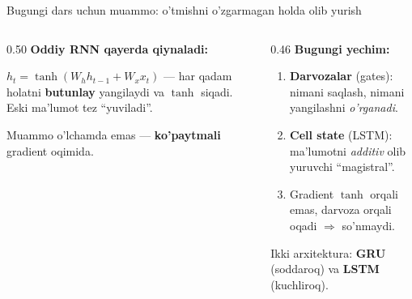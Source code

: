 \documentclass[aspectratio=169,11pt]{beamer}
\begin{document}
\begin{frame}{Bugungi dars uchun muammo: o'tmishni o'zgarmagan holda olib yurish}
  \begin{columns}[T]
    \begin{column}{0.50\textwidth}
      \textbf{Oddiy RNN qayerda qiynaladi:}\\[3pt]
      \small
      \begin{tcolorbox}[warnbox,title={Har qadam holatni qayta yozadi},top=2pt,bottom=2pt]
        \footnotesize
        $h_t=\tanh(W_h h_{t-1}+W_x x_t)$ --- har qadam holatni \textbf{butunlay}
        yangilaydi va $\tanh$ siqadi. Eski ma'lumot tez ``yuviladi''.
      \end{tcolorbox}
      \vspace{3pt}
      \begin{tcolorbox}[warnbox,title={Hidden o'lchamini oshirish yordam bermaydi},top=2pt,bottom=2pt]
        \footnotesize
        Muammo o'lchamda emas --- \textbf{ko'paytmali} gradient oqimida.
      \end{tcolorbox}
    \end{column}
    \begin{column}{0.46\textwidth}
      \textbf{Bugungi yechim:}\\[4pt]
      \small
      \begin{enumerate}\setlength\itemsep{4pt}
        \item \textbf{Darvozalar} (gates): nimani saqlash, nimani yangilashni
              \emph{o'rganadi}.
        \item \textbf{Cell state} (LSTM): ma'lumotni \emph{additiv} olib yuruvchi
              ``magistral''.
        \item Gradient $\tanh$ orqali emas, darvoza orqali oqadi $\Rightarrow$
              so'nmaydi.
      \end{enumerate}
      \vspace{5pt}
      \begin{tcolorbox}[okbox,top=2pt,bottom=2pt]
        \footnotesize
        Ikki arxitektura: \textbf{GRU} (soddaroq) va \textbf{LSTM} (kuchliroq).
      \end{tcolorbox}
    \end{column}
  \end{columns}
\end{frame}

\end{document}
